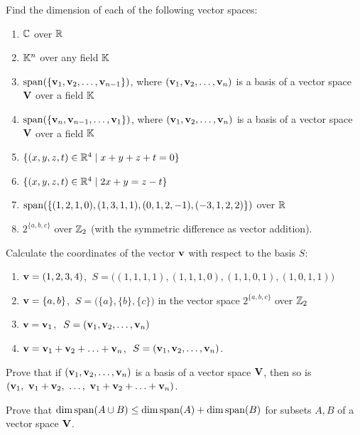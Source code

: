 \begin{exercise}
Find the dimension of each of the following vector spaces:
\begin{enumerate}[label=(\alph*)]
\item $\mathbb{C}$ over $\mathbb{R}$
\item $\mathbb{K}^n$ over any field $\mathbb{K}$
\item $\operatorname{span}\!\left(\{\mathbf{v}_1,\mathbf{v}_2,\ldots,\mathbf{v}_{n-1}\}\right)$, where $(\mathbf{v}_1,\mathbf{v}_2,\ldots,\mathbf{v}_n)$ is a basis of a
vector space $\mathbf{V}$ over a field $\mathbb{K}$
\item $\operatorname{span}\!\left(\{\mathbf{v}_n,\mathbf{v}_{n-1},\ldots,\mathbf{v}_1\}\right)$, where $(\mathbf{v}_1,\mathbf{v}_2,\ldots,\mathbf{v}_n)$ is a basis of a
vector space $\mathbf{V}$ over a field $\mathbb{K}$
\item $\{(x,y,z,t)\in\mathbb{R}^4 \mid x+y+z+t = 0\}$
\item $\{(x,y,z,t)\in\mathbb{R}^4 \mid 2x+y = z-t\}$
\item $\operatorname{span}\!\left(\{(1,2,1,0),(1,3,1,1),(0,1,2,-1),(-3,1,2,2)\}\right)$ over $\mathbb{R}$
\item $2^{\{a,b,c\}}$ over $\mathbb{Z}_2$ (with the symmetric difference as vector addition).
\end{enumerate}
\end{exercise}

\begin{exercise}
Calculate the coordinates of the vector $\mathbf{v}$ with respect to the basis $S$:
\begin{enumerate}[label=(\alph*)]
\item $\mathbf{v} = (1,2,3,4)$, $\ S = \big((1,1,1,1),(1,1,1,0),(1,1,0,1),(1,0,1,1)\big)$
\item $\mathbf{v} = \{a,b\}$, $\ S = \big(\{a\},\{b\},\{c\}\big)$ in the vector space $2^{\{a,b,c\}}$ over
$\mathbb{Z}_2$
\item $\mathbf{v} = \mathbf{v}_1$, $\ S = (\mathbf{v}_1,\mathbf{v}_2,\ldots,\mathbf{v}_n)$
\item $\mathbf{v} = \mathbf{v}_1+\mathbf{v}_2+\ldots+\mathbf{v}_n$, $\ S = (\mathbf{v}_1,\mathbf{v}_2,\ldots,\mathbf{v}_n)$.
\end{enumerate}
\end{exercise}

\begin{exercise}
Prove that if $(\mathbf{v}_1,\mathbf{v}_2,\ldots,\mathbf{v}_n)$ is a basis of a vector space $\mathbf{V}$, then so is
$(\vv_1,\ \vv_1+\vv_2,\ \ldots,\ \vv_1+\vv_2+\ldots+\vv_n)$.
\end{exercise}

\begin{exercise}
Prove that $\dim\operatorname{span}\!\left(A\cup B\right) \leq \dim\operatorname{span}\!\left(A\right) + \dim\operatorname{span}\!\left(B\right)$ for subsets $A,B$ of a vector space
$\mathbf{V}$.
\end{exercise}
